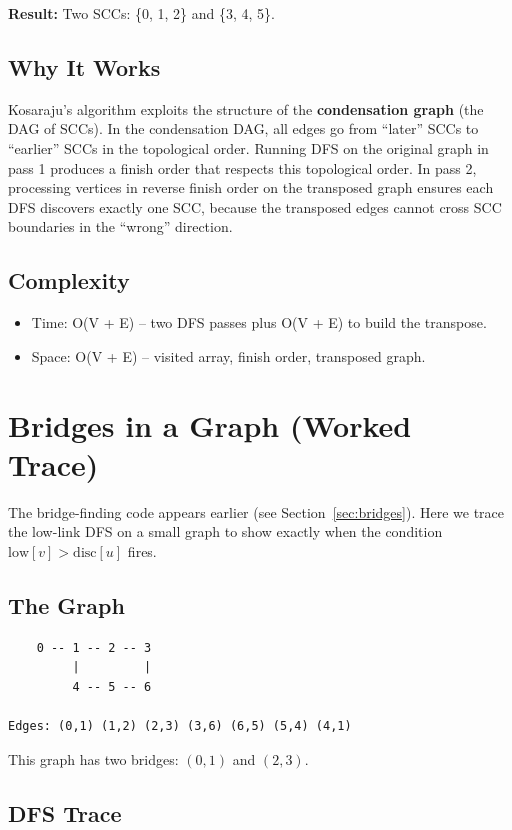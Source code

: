 \textbf{Result:} Two SCCs: \{0, 1, 2\} and \{3, 4, 5\}.

\subsection{Why It Works}

Kosaraju's algorithm exploits the structure of the \textbf{condensation graph} (the DAG of SCCs). In the condensation DAG, all edges go from ``later'' SCCs to ``earlier'' SCCs in the topological order. Running DFS on the original graph in pass 1 produces a finish order that respects this topological order. In pass 2, processing vertices in reverse finish order on the transposed graph ensures each DFS discovers exactly one SCC, because the transposed edges cannot cross SCC boundaries in the ``wrong'' direction.

\subsection{Complexity}

\begin{itemize}
\item Time: O(V + E) -- two DFS passes plus O(V + E) to build the transpose.
\item Space: O(V + E) -- visited array, finish order, transposed graph.
\end{itemize}

\section{Bridges in a Graph (Worked Trace)}

The bridge-finding code appears earlier (see Section~\ref{sec:bridges}). Here we trace the low-link DFS on a small graph to show exactly when the condition $\text{low}[v] > \text{disc}[u]$ fires.

\subsection{The Graph}

\begin{lstlisting}
    0 -- 1 -- 2 -- 3
         |         |
         4 -- 5 -- 6

Edges: (0,1) (1,2) (2,3) (3,6) (6,5) (5,4) (4,1)
\end{lstlisting}

This graph has two bridges: $(0,1)$ and $(2,3)$.

\subsection{DFS Trace}

